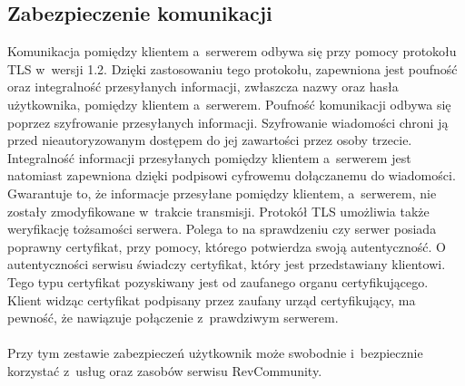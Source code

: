 \subsection{Zabezpieczenie komunikacji}

Komunikacja pomiędzy klientem a~serwerem odbywa się przy pomocy protokołu TLS w~wersji 1.2. Dzięki zastosowaniu tego protokołu, zapewniona jest poufność oraz integralność przesyłanych informacji, zwłaszcza nazwy oraz hasła użytkownika, pomiędzy klientem a~serwerem. Poufność komunikacji odbywa się poprzez szyfrowanie przesyłanych informacji. Szyfrowanie wiadomości chroni ją przed nieautoryzowanym dostępem do jej zawartości przez osoby trzecie.
Integralność informacji przesyłanych pomiędzy klientem a~serwerem jest natomiast zapewniona dzięki podpisowi cyfrowemu dołączanemu do wiadomości. Gwarantuje to, że informacje przesyłane pomiędzy klientem, a~serwerem, nie zostały zmodyfikowane w~trakcie transmisji.
 Protokół TLS umożliwia także weryfikację tożsamości serwera. Polega to na sprawdzeniu czy serwer posiada poprawny certyfikat, przy pomocy, którego potwierdza swoją autentyczność. O autentyczności serwisu świadczy certyfikat, który jest przedstawiany klientowi. Tego typu certyfikat pozyskiwany jest od zaufanego organu certyfikującego. Klient widząc certyfikat podpisany przez zaufany urząd certyfikujący, ma pewność, że nawiązuje połączenie z~prawdziwym serwerem.\cite{tls}
\paragraph{}
Przy tym zestawie zabezpieczeń użytkownik może swobodnie i~bezpiecznie korzystać z~usług oraz zasobów serwisu RevCommunity.

